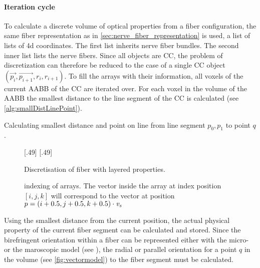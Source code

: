 \paragraph{Iteration cycle}
To calculate a discrete volume of optical properties from a fiber configuration, the same fiber representation as in \cref{sec:nerve_fiber_representation} is used, \ie{} a list of lists of 4d coordinates.
The first list inherits nerve fiber bundles.
The second inner list lists the nerve fibers.
Since all objects are \ac{CC}, the problem of discretization can therefore be reduced to the case of a single \ac{CC} object $(\vec{p_i}, \vec{p_{i+1}}, r_i, r_{i+1})$.
% 
To fill the arrays with their information, all voxels of the current \ac{AABB} of the \ac{CC} are iterated over.
For each voxel in the volume of the \ac{AABB} the smallest distance to the line segment of the \ac{CC} is calculated (see \cref{alg:smallDistLinePoint}).
\\
% 
\begin{lstfloat}[!tb]

\caption[Calculating smallest distance between line segment and point]{Calculating smallest distance and point on line from line segment $p_0, p_1$ to point $q$.}
\label{alg:smallDistLinePoint}
\end{lstfloat}
% 
\begin{figure}[!t]
\centering
\setlength{\tikzwidth}{0.45\textwidth}
[.49\textwidth]{
} \hfill
{}[.49\textwidth]{
}
\caption{Discretisation of fiber with layered properties.}
\label{fig:fiber_discretisation}
\end{figure}
% 
\begin{figure}[!t]
\centering
\def\tikzwidth{0.42\textwidth}
\caption{indexing of arrays.
The vector inside the array at index position $[i,j,k]$ will correspond to the vector at position $p=(i+0.5,j+0.5,k+0.5) \cdot \textnormal{$\mathit{v_{s}}$}$}
\label{fig:indexing_array}
\end{figure}
% 
Using the smallest distance from the current position, the actual physical property of the current fiber segment can be calculated and stored.
Since the birefringent orientation within a fiber can be represented either with the micro- or the maroscopic model (see \dummy{}), the radial or parallel orientation for a point $q$ in the volume (see \cref{fig:vectormodel}) to the fiber segment must be calculated.
